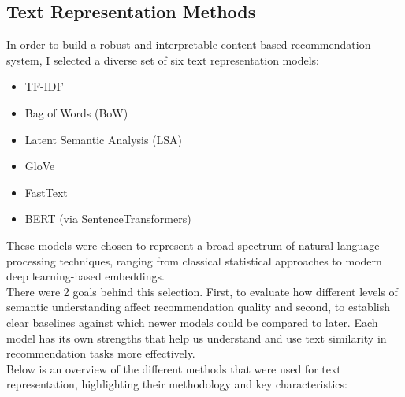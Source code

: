 \documentclass[\myFontSize,a4paper,oneside,english,hidelinks]{article}
\begin{document}
\subsection{Text Representation Methods}
In order to build a robust and interpretable content-based recommendation system, I selected a diverse set of six text representation models: 
\begin{itemize}
\item TF-IDF
\item Bag of Words (BoW)
\item Latent Semantic Analysis (LSA)
\item GloVe
\item FastText
\item BERT (via SentenceTransformers)
\end{itemize}
%
These models were chosen to represent a broad spectrum of natural language processing techniques, ranging from classical statistical approaches to modern deep learning-based embeddings.\\
%
There were 2 goals behind this selection. First, to evaluate how different levels of semantic understanding affect recommendation quality and second, to establish clear baselines against which newer models could be compared to later. Each model has its own strengths that help us understand and use text similarity in recommendation tasks more effectively.\\
%
%
Below is an overview of the different methods that were used for text representation, highlighting their methodology and key characteristics:
\end{document}
